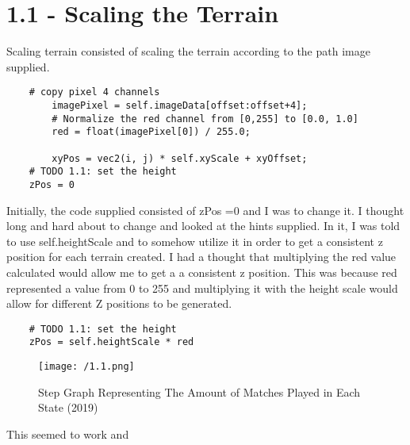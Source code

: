 \documentclass[11pt, oneside, a4paper]{article}
\begin{document}
\section*{1.1 - Scaling the Terrain}
Scaling terrain consisted of scaling the terrain according to the path image supplied.
\begin{lstlisting}    
	# copy pixel 4 channels
        imagePixel = self.imageData[offset:offset+4];
        # Normalize the red channel from [0,255] to [0.0, 1.0]
        red = float(imagePixel[0]) / 255.0;

        xyPos = vec2(i, j) * self.xyScale + xyOffset;
	# TODO 1.1: set the height
	zPos = 0
\end{lstlisting}

Initially, the code supplied consisted of zPos =0 and I was to change it. I thought long and hard about to change and looked at the hints supplied. In it, I was told to use self.heightScale and to somehow utilize it in order to get a consistent z position for each terrain created. I had a thought that multiplying the red value calculated would allow me to get a a consistent z position. This was because red represented a value from 0 to 255 and multiplying it with the height scale would allow for different Z positions to be generated.

\begin{lstlisting}    
	# TODO 1.1: set the height
	zPos = self.heightScale * red
\end{lstlisting}

\begin{figure}[!ht]
	\centerline{\texttt{[image: /1.1.png]}}
	\caption{Step Graph Representing The Amount of Matches Played in Each State (2019)}
	\label{fig:figure2}
\end{figure}


This seemed to work and 
\end{document}
